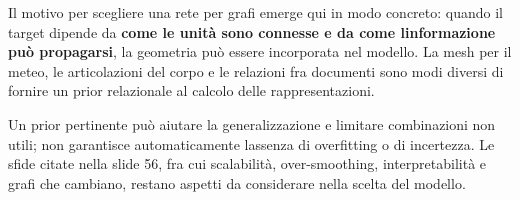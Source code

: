 \documentclass[11pt,a4paper,oneside,openany]{book}
\begin{document}
Il motivo per scegliere una rete per grafi emerge qui in modo concreto: quando il target dipende da \textbf{come le unità sono connesse e da come l\textquotesingle informazione può propagarsi}, la geometria può essere incorporata nel modello. La mesh per il meteo, le articolazioni del corpo e le relazioni fra documenti sono modi diversi di fornire un prior relazionale al calcolo delle rappresentazioni.

Un prior pertinente può aiutare la generalizzazione e limitare combinazioni non utili; non garantisce automaticamente l\textquotesingle assenza di overfitting o di incertezza. Le sfide citate nella slide 56, fra cui scalabilità, over-smoothing, interpretabilità e grafi che cambiano, restano aspetti da considerare nella scelta del modello.
\end{document}
